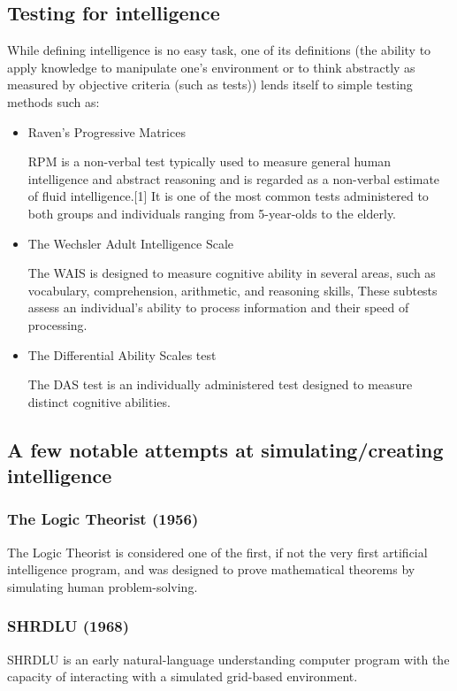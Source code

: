 \documentclass[masterthesis]{fer}
\begin{document}
\subsection{Testing for intelligence}
While defining intelligence is no easy task, one of its definitions (the ability to apply knowledge to manipulate one's environment or to think abstractly as measured by objective criteria (such as tests)) lends itself to simple testing methods such as:
\begin{itemize}
\item{Raven's Progressive Matrices}

RPM is a non-verbal test typically used to measure general human intelligence and abstract reasoning and is regarded as a non-verbal estimate of fluid intelligence.[1] It is one of the most common tests administered to both groups and individuals ranging from 5-year-olds to the elderly.
\item{The Wechsler Adult Intelligence Scale}

The WAIS is designed to measure cognitive ability in several areas, such as vocabulary, comprehension, arithmetic, and reasoning skills, These subtests assess an individual's ability to process information and their speed of processing.
\item{The Differential Ability Scales test}

The DAS test is an individually administered test designed to measure distinct cognitive abilities.
\end{itemize}

\subsection{A few notable attempts at simulating/creating intelligence}
\subsubsection{The Logic Theorist (1956)}
The Logic Theorist is considered one of the first, if not the very first artificial intelligence program, and was designed to prove mathematical theorems by simulating human problem-solving.

\subsubsection{SHRDLU (1968)}
SHRDLU is an early natural-language understanding computer program with the capacity of interacting with a simulated grid-based environment.
\end{document}
